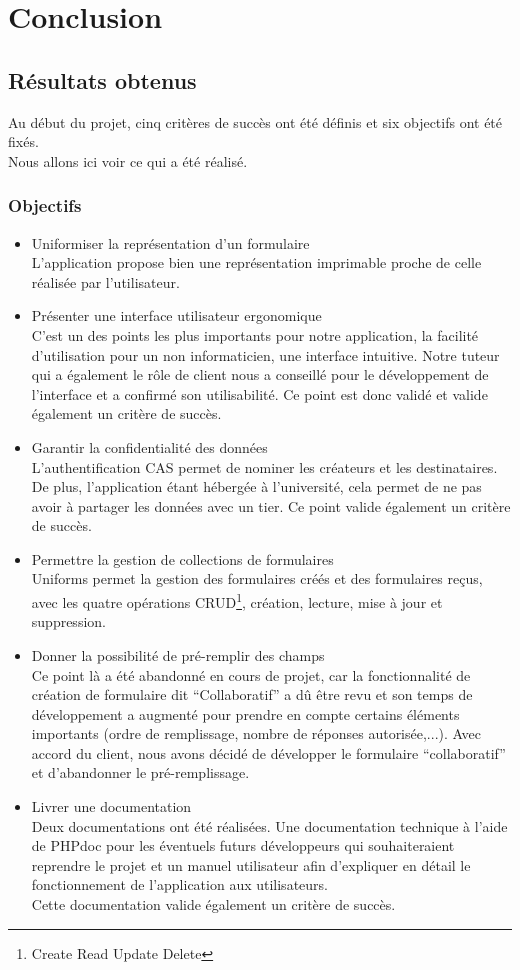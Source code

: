 \documentclass{sigplanconf}
\begin{document}
\section{Conclusion}
\subsection{Résultats obtenus}
Au début du projet, cinq critères de succès ont été définis et six objectifs ont été fixés.\\ 
Nous allons ici voir ce qui a été réalisé. 
\subsubsection{Objectifs}
\begin{itemize}
\item Uniformiser la représentation d'un formulaire\\
L’application propose bien une représentation imprimable proche de celle réalisée par l’utilisateur.
\item Présenter une interface utilisateur ergonomique\\
C’est un des points les plus importants pour notre application, la facilité d’utilisation pour un non informaticien, une interface intuitive. Notre tuteur qui a également le rôle de client nous a conseillé pour le développement de l’interface et a confirmé son utilisabilité. Ce point est donc validé et valide également un critère de succès.
\item Garantir la confidentialité des données\\
L’authentification CAS permet de nominer les créateurs et les destinataires. De plus, l’application étant hébergée à l’université, cela permet de ne pas avoir à partager les données avec un tier. Ce point valide également un critère de succès.
\item Permettre la gestion de collections de formulaires\\
Uniforms permet la gestion des formulaires créés et des formulaires reçus, avec les quatre opérations CRUD\footnote{Create Read Update Delete}, création, lecture, mise à jour et suppression.
\item Donner la possibilité de pré-remplir des champs\\
Ce point là a été abandonné en cours de projet, car la fonctionnalité de création de formulaire dit “Collaboratif” a dû être revu et son temps de développement a augmenté pour prendre en compte certains éléments importants (ordre de remplissage, nombre de réponses autorisée,...). Avec accord du client, nous avons décidé de développer le formulaire “collaboratif” et d’abandonner le pré-remplissage.
\item Livrer une documentation\\
Deux documentations ont été réalisées. Une documentation technique à l’aide de PHPdoc pour les éventuels futurs développeurs qui souhaiteraient reprendre le projet et un manuel utilisateur afin d’expliquer en détail le fonctionnement de l’application aux utilisateurs.\\
Cette documentation valide également un critère de succès.
\end{itemize}
\end{document}
